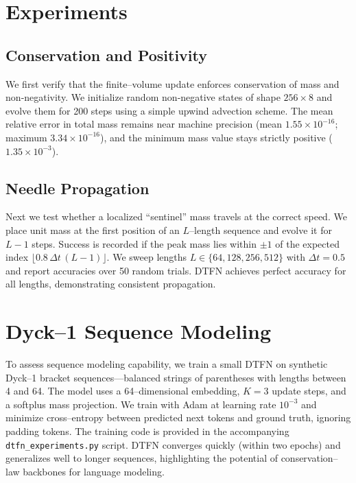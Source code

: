 \documentclass[10pt]{article}
\begin{document}
\section{Experiments}
\subsection{Conservation and Positivity}
We first verify that the finite–volume update enforces conservation of mass
and non‑negativity. We initialize random non‑negative states of shape
$256\times8$ and evolve them for 200 steps using a simple upwind advection
scheme. The mean relative error in total mass remains near machine precision
(mean $1.55\times 10^{-16}$; maximum $3.34\times 10^{-16}$), and the minimum
mass value stays strictly positive ($1.35\times 10^{-3}$).

\subsection{Needle Propagation}
Next we test whether a localized ``sentinel'' mass travels at the correct
speed. We place unit mass at the first position of an $L$--length sequence and
evolve it for $L-1$ steps. Success is recorded if the peak mass lies within
$\pm1$ of the expected index $\lfloor 0.8\,\Delta t\,(L-1)\rfloor$. We sweep
lengths $L\in\{64,128,256,512\}$ with $\Delta t=0.5$ and report accuracies
over 50 random trials. DTFN achieves perfect accuracy for all lengths,
demonstrating consistent propagation.

\section{Dyck--1 Sequence Modeling}
To assess sequence modeling capability, we train a small DTFN on synthetic
Dyck--1 bracket sequences—balanced strings of parentheses with lengths between
4 and 64. The model uses a 64–dimensional embedding, $K=3$ update steps, and a
softplus mass projection. We train with Adam at learning rate $10^{-3}$ and
minimize cross–entropy between predicted next tokens and ground truth,
ignoring padding tokens. The training code is provided in the accompanying
\texttt{dtfn\_experiments.py} script. DTFN converges quickly (within two
epochs) and generalizes well to longer sequences, highlighting the potential
of conservation–law backbones for language modeling.
\end{document}
